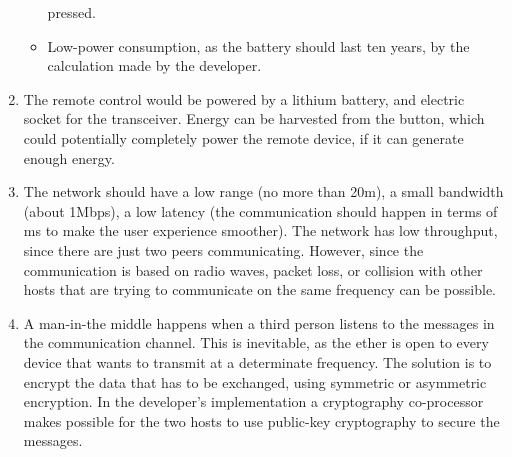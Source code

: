 \documentclass[acmsmall, screen,timestamp,nonacm]{acmart}
\begin{document}
\begin{enumerate}
\begin{itemize}
				pressed. 
			\item Low-power consumption, as the battery should last ten years,
				by the calculation made by the developer.
		\end{itemize}
	\item The remote control would be powered by a lithium battery, and electric
		socket for the transceiver. Energy can be harvested from the button,
		which could potentially completely power the remote device, if it can
		generate enough energy. 
	\item The network should have a low range (no more than 20m), a small
		bandwidth (about 1Mbps), a low latency (the communication should happen
		in terms of ms to make the user experience smoother). The network has low throughput, since there are just two peers
		communicating. However, since the communication is based on radio waves,
		packet loss, or collision with other hosts that are trying to
		communicate on the same frequency can be possible.
	\item A man-in-the middle happens when a third person listens to the messages in the communication
		channel. This is inevitable, as the ether is open to every device that
		wants to transmit at a determinate frequency. 
		The solution is to encrypt the data that has to be exchanged, using
		symmetric or asymmetric encryption. In the developer's
		implementation a cryptography co-processor makes possible for
		the two hosts to use public-key cryptography to secure the messages. 
\end{enumerate}

\end{document}
